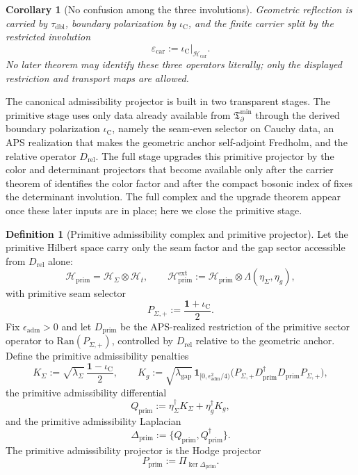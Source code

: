 \documentclass[11pt,a4paper]{article}
\newtheorem{corollary}[theorem]{Corollary}
\theoremstyle{definition}
\newtheorem{definition}[theorem]{Definition}
\theoremstyle{remark}
\newcommand{\Seam}{\Sigma}
\newcommand{\taudbl}{\tau_{\mathrm{dbl}}}
\newcommand{\iC}{\iota_{\mathrm C}}
\newcommand{\epscar}{\varepsilon_{\mathrm{car}}}
\newcommand{\Tbound}{\mathfrak T_{\partial}^{\min}}
\newcommand{\Pprim}{P_{\mathrm{prim}}}
\begin{document}
\begin{corollary}[No confusion among the three involutions]
Geometric reflection is carried by $\taudbl$, boundary polarization by $\iC$, and the finite
carrier split by the restricted involution
\[
\epscar:=\iC|_{\mathcal H_{\mathrm{car}}}.
\]
No later theorem may identify these three operators literally; only the displayed restriction and
transport maps are allowed.
\end{corollary}

The canonical admissibility projector is built in two transparent stages. The primitive stage
uses only data already available from $\Tbound$ through the derived boundary polarization $\iC$,
namely the seam-even selector on Cauchy data, an APS realization that makes the geometric anchor
self-adjoint Fredholm, and the relative operator $D_{\mathrm{rel}}$. The full stage upgrades this
primitive projector by the color and determinant projectors that become available only after the
carrier theorem of  identifies the color factor and after the
compact bosonic index of  fixes the determinant involution. The full
complex and the upgrade theorem appear once these later inputs are in place; here we close the
primitive stage.

\begin{definition}[Primitive admissibility complex and primitive projector]
\label{def:admissibility-complex}
\label{def:primitive-admissibility-complex}
Let the primitive Hilbert space carry only the seam factor and the gap sector accessible from
$D_{\mathrm{rel}}$ alone:
\[
\mathcal H_{\mathrm{prim}}=\mathcal H_{\Seam}\otimes\mathcal H_t,
\qquad
\mathcal H_{\mathrm{prim}}^{\mathrm{ext}}
:=
\mathcal H_{\mathrm{prim}}\otimes\Lambda(\eta_\Sigma,\eta_g),
\]
with primitive seam selector
\[
P_{\Seam,+}:=\frac{\mathbf 1+\iC}{2}.
\]
Fix $\epsilon_{\mathrm{adm}}>0$ and let $D_{\mathrm{prim}}$ be the APS-realized restriction of
the primitive sector operator to $\mathrm{Ran}(P_{\Seam,+})$, controlled by $D_{\mathrm{rel}}$
relative to the geometric anchor. Define the primitive admissibility penalties
\[
K_\Sigma:=\sqrt{\lambda_\Sigma}\,\frac{\mathbf 1-\iC}{2},
\qquad
K_g:=\sqrt{\lambda_{\mathrm{gap}}}\,
\mathbf 1_{[0,\epsilon_{\mathrm{adm}}^2/4)}\!
\bigl(P_{\Seam,+}D_{\mathrm{prim}}^\dagger D_{\mathrm{prim}}P_{\Seam,+}\bigr),
\]
the primitive admissibility differential
\[
Q_{\mathrm{prim}}
:=
\eta_\Sigma^\dagger K_\Sigma
+\eta_g^\dagger K_g,
\]
and the primitive admissibility Laplacian
\[
\Delta_{\mathrm{prim}}:=\{Q_{\mathrm{prim}},Q_{\mathrm{prim}}^\dagger\}.
\]
The primitive admissibility projector is the Hodge projector
\[
\Pprim
:=
\Pi_{\ker\Delta_{\mathrm{prim}}}.
\]
\end{definition}
\end{document}
